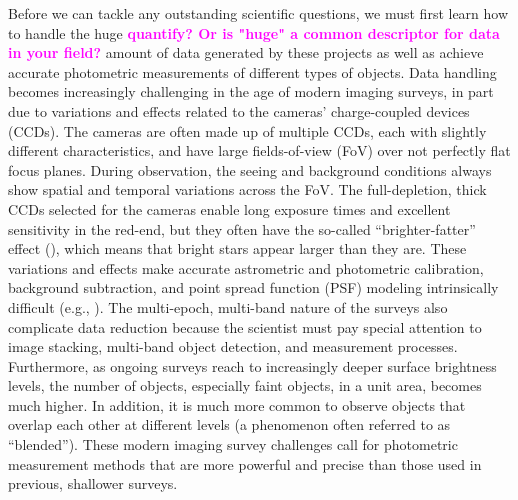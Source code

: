 \documentclass[useamsfonts]{pasj01}
\newcommand{\susan}[1]{\textcolor{magenta} {\textbf{#1}}}
\begin{document}
    Before we can tackle any outstanding scientific questions, we must first learn
    how to handle the huge \susan{quantify? Or is "huge" a common descriptor for data in your field?} amount of data generated by these projects as well as achieve
    accurate photometric measurements of different types of objects.
    Data handling becomes increasingly challenging in the age of modern imaging
    surveys, in part due to variations and effects related to the cameras' charge-coupled devices (CCDs).
    The cameras are often made up of multiple
  CCDs, each with slightly different characteristics, and have
    large fields-of-view (FoV) over not perfectly flat focus planes.
    During  observation, the seeing and background conditions always show spatial
    and temporal variations across the FoV.
    The full-depletion, thick CCDs selected for the cameras enable long exposure times
    and excellent sensitivity in the red-end, but they often have the so-called
    ``brighter-fatter'' effect (\citealt{Antilogus2014}), which means that bright
    stars appear larger than they are.
   These variations and effects make accurate astrometric and photometric calibration,
    background subtraction, and point spread function (PSF) modeling intrinsically
    difficult (e.g., \citealt{Schlafly2012}).
    The multi-epoch, multi-band nature of the surveys also complicate
    data reduction because the scientist must pay special attention to
    image stacking, multi-band object detection, and measurement processes.
     Furthermore, as ongoing surveys reach to increasingly deeper surface brightness levels,
    the number of objects, especially faint objects, in a unit area, becomes much higher.
   In addition, it is much more common to observe objects that overlap each other at
    different levels (a phenomenon often referred to as ``blended'').
    These modern imaging survey challenges call for photometric measurement methods that are more powerful and precise than those
    used in previous, shallower surveys.
\end{document}
